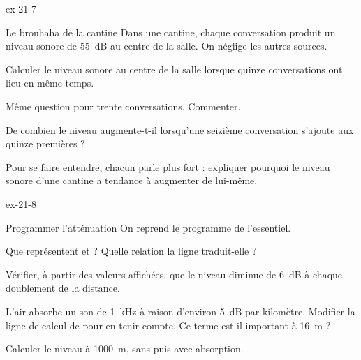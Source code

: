 \begin{blocLivre}{ex-21-7}
\begin{exercice}[2]{Le brouhaha de la cantine}
Dans une cantine, chaque conversation produit un niveau sonore de \qty{55}{dB} au centre de la salle. On néglige les
autres sources.
\begin{questions}
\item Calculer le niveau sonore au centre de la salle lorsque quinze conversations ont lieu en même temps.
\item Même question pour trente conversations. Commenter.
\item De combien le niveau augmente-t-il lorsqu'une seizième conversation s'ajoute aux quinze premières ?
\item Pour se faire entendre, chacun parle plus fort : expliquer pourquoi le niveau sonore d'une cantine a tendance à
augmenter de lui-même.
\end{questions}
\end{exercice}
\end{blocLivre}
\begin{blocLivre}{ex-21-8}
\begin{exercice}[2]{Programmer l'atténuation}
On reprend le programme de l'essentiel.
\begin{questions}
\item {}Que représentent  et  ? Quelle relation la ligne 
traduit-elle ?
\item Vérifier, à partir des valeurs affichées, que le niveau diminue de \qty{6}{dB} à chaque doublement de la distance.
\item L'air absorbe un son de \qty{1}{kHz} à raison d'environ \qty{5}{dB} par kilomètre. Modifier la ligne de calcul de
 pour en tenir compte. Ce terme est-il important à \qty{16}{m} ?
\item Calculer le niveau à \qty{1000}{m}, sans puis avec absorption.
\end{questions}
\end{exercice}
\end{blocLivre}
